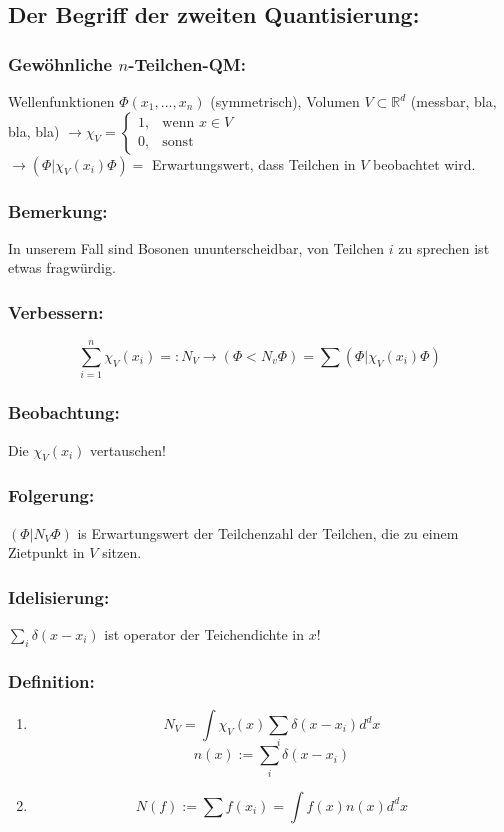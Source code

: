 \documentclass[twoside,a4paper]{scrartcl}
\newcommand{\R}{\mathbb{R}}
\renewcommand{\1}{\mathds{1}}
\newcommand{\ra}{\rightarrow}
\renewcommand{\R}{\mathbb{R}}
\begin{document}
\subsection{Der Begriff der zweiten Quantisierung:}
\subsubsection{Gewöhnliche $n$-Teilchen-QM:}
Wellenfunktionen $\Phi(x_1,...,x_n)$ (symmetrisch), Volumen $V \subset \R^d$ (messbar, bla, bla, bla) $\ra \chi_V=\begin{cases}
  1,  & \text{wenn }x \in V\\
  0, & \text{sonst}
\end{cases}$\\
$\ra (\Phi|\chi_V(x_i)\Phi)=$ Erwartungswert, dass Teilchen in $V$ beobachtet wird.
\subsubsection*{Bemerkung:}
In unserem Fall sind Bosonen ununterscheidbar, von Teilchen $i$ zu sprechen ist etwas fragwürdig.
\subsubsection*{Verbessern:}
 $$\sum_{i=1}^n \chi_V(x_i)=:N_V \ra (\Phi<N_v \Phi)=\sum (\Phi|\chi_V(x_i)\Phi)$$
\subsubsection*{Beobachtung:}
Die $\chi_V(x_i)$ vertauschen!
\subsubsection*{Folgerung:}
$(\Phi|N_V\Phi)$ is Erwartungswert der Teilchenzahl der Teilchen, die zu einem Zietpunkt in $V$ sitzen.
\subsubsection*{Idelisierung:}
$\sum_i \delta(x-x_i)$ ist operator der Teichendichte in $x$!
\subsubsection*{Definition:}
\begin{enumerate}
\item $$N_V=\int \chi_V(x)\sum_i \delta(x-x_i) d^dx$$
$$n(x):= \sum_i \delta(x-x_i)$$
\item $$N(f):= \sum f(x_i)=\int f(x) n(x) d^dx$$
\end{enumerate}
\end{document}
